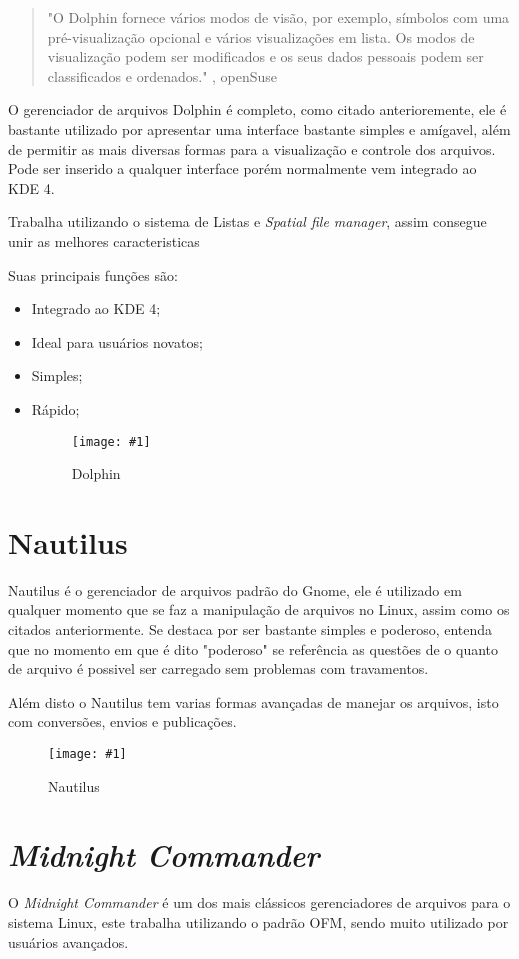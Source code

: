 \documentclass[
	12pt,				%
	openright,			%
	twoside,			%
	a4paper,			%
	chapter=TITLE,		%
	section=TITLE,		%
	english,	
	brazil				%
]{abntex2}
\newcommand{\imagem}[3]{
	\begin{figure}[htb]
		\begin{center}
			\texttt{[image: \#1]}
		\end{center}
		\caption{#2}%
	\end{figure}	
}
\begin{document}
\begin{quote}
"O Dolphin fornece vários modos de visão, por exemplo, símbolos com uma pré-visualização opcional e vários visualizações em lista. Os modos de visualização podem ser modificados e os seus dados pessoais podem ser classificados e ordenados." , openSuse
\end{quote}

O gerenciador de arquivos Dolphin é completo, como citado anterioremente, ele é bastante utilizado por apresentar uma interface bastante simples e amígavel, além de permitir as mais diversas formas para a visualização e controle dos arquivos. Pode ser inserido a qualquer interface porém normalmente vem integrado ao KDE 4.

Trabalha utilizando o sistema de Listas e \textit{Spatial file manager}, assim consegue unir as melhores caracteristicas 

Suas principais funções são:

\begin{itemize}
	\item Integrado ao KDE 4;
	\item Ideal para usuários novatos;
	\item Simples;
	\item Rápido;
	\imagem{dolphinGec.jpg}{Dolphin}{rótulo_para_referência}
\end{itemize}

\section{Nautilus}

Nautilus é o gerenciador de arquivos padrão do Gnome, ele é utilizado em qualquer momento que se faz a manipulação de arquivos no Linux, assim como os citados anteriormente. Se destaca por ser bastante simples e poderoso, entenda que no momento em que é dito "poderoso" se referência as questões de o quanto de arquivo é possivel ser carregado sem problemas com travamentos.

Além disto o Nautilus tem varias formas avançadas de manejar os arquivos, isto com conversões, envios e publicações.

\imagem{Nautilus.png}{Nautilus}{rótulo_para_referência}


\section{\textit{Midnight Commander}}

O \textit{Midnight Commander} é um dos mais clássicos gerenciadores de arquivos para o sistema Linux, este trabalha utilizando o padrão OFM, sendo muito utilizado por usuários avançados.
\end{document}
